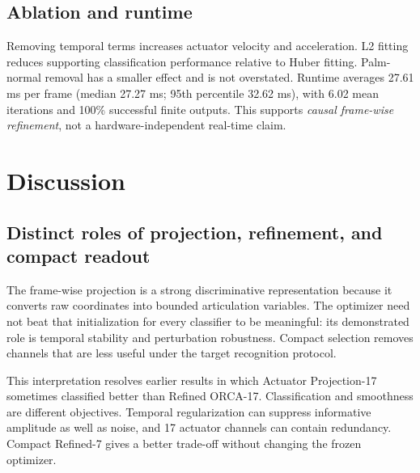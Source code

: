 \documentclass[11pt]{article}
\begin{document}
\subsection{Ablation and runtime}
Removing temporal terms increases actuator velocity and acceleration. L2 fitting reduces supporting classification performance relative to Huber fitting. Palm-normal removal has a smaller effect and is not overstated. Runtime averages 27.61 ms per frame (median 27.27 ms; 95th percentile 32.62 ms), with 6.02 mean iterations and 100\% successful finite outputs. This supports \emph{causal frame-wise refinement}, not a hardware-independent real-time claim.

\begin{table}[t]
\centering
\caption{Supporting objective ablation. Classification values are supporting results, not the frozen Compact Refined-7 final comparison.}
\label{tab:ablation}
\small

\end{table}

\begin{table}[t]
\centering
\caption{Runtime and convergence diagnostics.}
\label{tab:runtime}
\small
\resizebox{\linewidth}{!}{}
\end{table}

\FloatBarrier
\section{Discussion}

\subsection{Distinct roles of projection, refinement, and compact readout}
The frame-wise projection is a strong discriminative representation because it converts raw coordinates into bounded articulation variables. The optimizer need not beat that initialization for every classifier to be meaningful: its demonstrated role is temporal stability and perturbation robustness. Compact selection removes channels that are less useful under the target recognition protocol.

This interpretation resolves earlier results in which Actuator Projection-17 sometimes classified better than Refined ORCA-17. Classification and smoothness are different objectives. Temporal regularization can suppress informative amplitude as well as noise, and 17 actuator channels can contain redundancy. Compact Refined-7 gives a better trade-off without changing the frozen optimizer.
\end{document}
